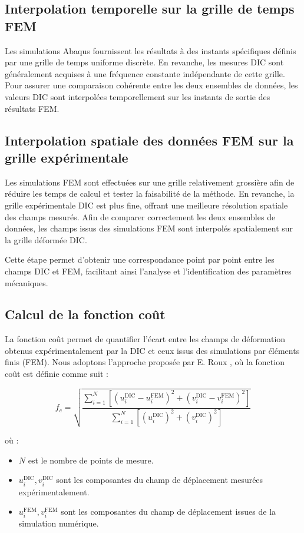 \documentclass[12pt,a4paper]{article}
\begin{document}
\subsection{Interpolation temporelle sur la grille de temps FEM}
Les simulations Abaqus fournissent les résultats à des instants spécifiques définis par une grille de temps uniforme discrète. En revanche, les mesures DIC sont généralement acquises à une fréquence constante indépendante de cette grille. Pour assurer une comparaison cohérente entre les deux ensembles de données, les valeurs DIC sont interpolées temporellement sur les instants de sortie des résultats FEM.

\subsection{Interpolation spatiale des données FEM sur la grille expérimentale}
Les simulations FEM sont effectuées sur une grille relativement grossière afin de réduire les temps de calcul et tester la faisabilité de la méthode. En revanche, la grille expérimentale DIC est plus fine, offrant une meilleure résolution spatiale des champs mesurés. Afin de comparer correctement les deux ensembles de données, les champs issus des simulations FEM sont interpolés spatialement sur la grille déformée DIC.

Cette étape permet d'obtenir une correspondance point par point entre les champs DIC et FEM, facilitant ainsi l'analyse et l’identification des paramètres mécaniques.

\subsection{Calcul de la fonction coût}

La fonction coût permet de quantifier l'écart entre les champs de déformation obtenus expérimentalement par la DIC et ceux issus des simulations par éléments finis (FEM). Nous adoptons l'approche proposée par E. Roux \cite{Roux2011}, où la fonction coût est définie comme suit :

\begin{equation}
    f_c = \sqrt{\frac{\sum_{i=1}^{N} \left[ (u_i^{\text{DIC}} - u_i^{\text{FEM}})^2 + (v_i^{\text{DIC}} - v_i^{\text{FEM}})^2 \right]}{\sum_{i=1}^{N} \left[ (u_i^{\text{DIC}})^2 + (v_i^{\text{DIC}})^2 \right]}}
\end{equation}

où :
\begin{itemize}
    \item $N$ est le nombre de points de mesure.
    \item $u_i^{\text{DIC}}, v_i^{\text{DIC}}$ sont les composantes du champ de déplacement mesurées expérimentalement.
    \item $u_i^{\text{FEM}}, v_i^{\text{FEM}}$ sont les composantes du champ de déplacement issues de la simulation numérique.
\end{itemize}
\end{document}
